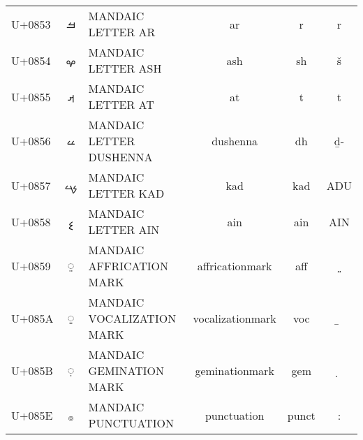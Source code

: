 {\begin{longtable}[l]{lclccc}
U+0853 & \ftldfont ࡓ & MANDAIC LETTER AR & ar & r & r \\ 
U+0854 & \ftldfont ࡔ & MANDAIC LETTER ASH & ash & sh & š \\ 
U+0855 & \ftldfont ࡕ & MANDAIC LETTER AT & at & t & t \\ 
U+0856 & \ftldfont ࡖ & MANDAIC LETTER DUSHENNA & dushenna & dh & ḏ- \\ 
U+0857 & \ftldfont ࡗ & MANDAIC LETTER KAD & kad & kad & ADU \\ 
U+0858 & \ftldfont ࡘ & MANDAIC LETTER AIN & ain & ain & AIN \\ 
U+0859 & \ftldfont ࡙ & MANDAIC AFFRICATION MARK & affricationmark & aff & ̤̤ \\ 
U+085A & \ftldfont ࡚ & MANDAIC VOCALIZATION MARK & vocalizationmark & voc & ̱ \\ 
U+085B & \ftldfont ࡛ & MANDAIC GEMINATION MARK & geminationmark & gem & ̣ \\ 
U+085E & \ftldfont ࡞ & MANDAIC PUNCTUATION & punctuation & punct & : \\ \hline\end{longtable}
}
